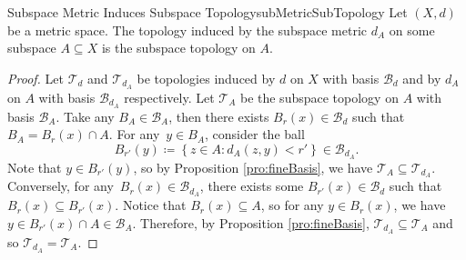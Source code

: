 \documentclass[math]{amznotes}
\theoremstyle{remark}
\begin{document}
\begin{probox}{Subspace Metric Induces Subspace Topology}{subMetricSubTopology}
    Let $\left(X, d\right)$ be a metric space. The topology induced by the subspace metric $d_A$ on some subspace $A \subseteq X$ is the subspace topology on $A$.
    \tcblower
    \begin{proof}
        Let $\mathcal{T}_d$ and $\mathcal{T}_{d_A}$ be topologies induced by $d$ on $X$ with basis $\mathcal{B}_d$ and by $d_A$ on $A$ with basis $\mathcal{B}_{d_A}$ respectively. Let $\mathcal{T}_A$ be the subspace topology on $A$ with basis $\mathcal{B}_A$. Take any $B_A \in \mathcal{B}_A$, then there exists $B_r\left(x\right) \in \mathcal{B}_d$ such that $B_A = B_r\left(x\right) \cap A$. For any~$y \in B_A$, consider the ball 
        \begin{equation*}
            B_{r'}\left(y\right) \coloneqq \left\{z \in A \colon d_A\left(z, y\right) < r'\right\} \in \mathcal{B}_{d_A}.
        \end{equation*}
        Note that $y \in B_{r'}\left(y\right)$, so by Proposition \ref{pro:fineBasis}, we have $\mathcal{T}_A \subseteq \mathcal{T}_{d_A}$. Conversely, for any~$B_r\left(x\right) \in \mathcal{B}_{d_A}$, there exists some $B_{r'}\left(x\right) \in \mathcal{B}_d$ such that $B_r\left(x\right) \subseteq B_{r'}\left(x\right)$. Notice that $B_r\left(x\right) \subseteq A$, so for any $y \in B_r\left(x\right)$, we have $y \in B_{r'}\left(x\right) \cap A \in \mathcal{B}_A$. Therefore, by Proposition \ref{pro:fineBasis}, $\mathcal{T}_{d_A} \subseteq \mathcal{T}_A$ and so $\mathcal{T}_{d_A} = \mathcal{T}_A$.
    \end{proof}
\end{probox}
\end{document}
